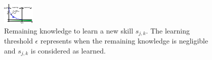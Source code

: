 \begin{figure}[!t]
	\centering
	\includegraphics[width=0.95\columnwidth]{fig/knowledge_idealization.pdf}
	\caption{Remaining knowledge to learn a new skill $s_{j,k}$. The learning threshold $\epsilon$ represents when the remaining knowledge is negligible and $s_{j,k}$ is considered as learned.}
	\label{fig:knowledge_idealization}
\end{figure}
